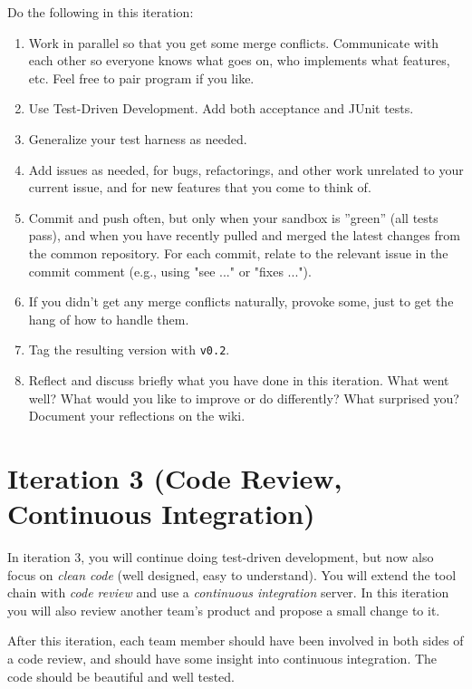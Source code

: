 \documentclass[swedish,english]{article}
\begin{document}
Do the following in this iteration:

\begin{enumerate}
\item Work in parallel so that you get some merge conflicts. Communicate with each other so everyone knows what goes on, who implements what features, etc. Feel free to pair program if you like.
\item Use Test-Driven Development. Add both acceptance and JUnit tests.
\item Generalize your test harness as needed.
\item Add issues as needed, for bugs, refactorings, and other work unrelated to your current issue, and for new features that you come to think of. 
\item Commit and push often, but only when your sandbox is ''green'' (all tests pass), and when you have recently pulled and merged the latest changes from the common repository. For each commit, relate to the relevant issue in the commit comment (e.g., using "see ..." or "fixes ...").
\item If you didn't get any merge conflicts naturally, provoke some, just to get the hang of how to handle them.
\item Tag the resulting version with \verb'v0.2'.
\item Reflect and discuss briefly what you have done in this iteration. What went well? What would you like to improve or do differently? What surprised you? Document your reflections on the wiki.
\end{enumerate}

\section*{Iteration 3 (Code Review, Continuous Integration)}
In iteration 3, you will continue doing test-driven development, but now also focus on \emph{clean code} (well designed, easy to understand). You will extend the tool chain with \emph{code review} and use a \emph{continuous integration} server. In this iteration you will also review another team's product and propose a small change to it.

After this iteration, each team member should have been involved in both sides of a code review, and should have some insight into continuous integration. The code should be beautiful and well tested.
\end{document}

